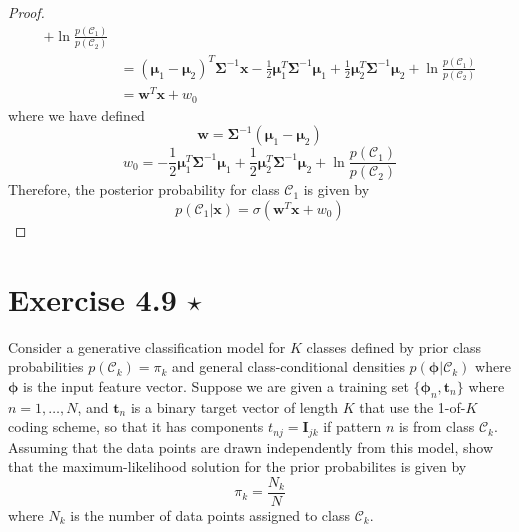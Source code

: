 \begin{proof}
\begin{align*}
        + \ln \frac{p(\mathcal{C}_1)}{p(\mathcal{C}_2)}\\
        &= (\bm{\mu}_1 - \bm{\mu}_2)^T \mathbf{\Sigma}^{-1} \mathbf{x}
        - \frac{1}{2} \bm{\mu}_1^T\mathbf{\Sigma}^{-1}\bm{\mu}_1
        + \frac{1}{2} \bm{\mu}_2^T\mathbf{\Sigma}^{-1}\bm{\mu}_2
        + \ln \frac{p(\mathcal{C}_1)}{p(\mathcal{C}_2)}\\
        &= \mathbf{w}^T\mathbf{x} + w_0
    \end{align*}
    where we have defined 
    \begin{equation*}
        \mathbf{w} = \mathbf{\Sigma}^{-1}(\bm{\mu}_1 - \bm{\mu}_2)
        \tag{4.66}\label{eq:4.66}
    \end{equation*}
    \vspace{-1em}
    \begin{equation*}
        w_0 = 
        - \frac{1}{2} \bm{\mu}_1^T\mathbf{\Sigma}^{-1}\bm{\mu}_1
        + \frac{1}{2} \bm{\mu}_2^T\mathbf{\Sigma}^{-1}\bm{\mu}_2
        + \ln \frac{p(\mathcal{C}_1)}{p(\mathcal{C}_2)}
        \tag{4.67}\label{eq:4.67}
    \end{equation*}
    Therefore, the posterior probability for class $\mathcal{C}_1$ 
    is given by
    \begin{equation*}
        p(\mathcal{C}_1 | \mathbf{x}) = \sigma(\mathbf{w}^T\mathbf{x} + w_0)
        \tag{4.65}\label{eq:4.65}
    \end{equation*}
\end{proof}

\section*{Exercise 4.9 $\star$}
Consider a generative classification model for $K$ classes
defined by prior class probabilities $p(\mathcal{C}_k) = \pi_k$
and general class-conditional densities  $p(\bm{\phi} | \mathcal{C}_k)$
where $\mathbf{\phi}$ is the input feature vector. Suppose
we are given a training set $\{\bm{\phi}_n, \mathbf{t}_n\}$ where
$n = 1,\ldots, N$, and $\mathbf{t}_n$ is a binary target vector
of length $K$ that use the 1-of-$K$ coding scheme, so
that it has components $t_{nj} = \mathbf{I}_{jk}$ if pattern
$n$ is from class $\mathcal{C}_k$. Assuming that the data points
are drawn independently from this model, show that the 
maximum-likelihood solution for the prior probabilites is given
by 
\begin{equation*}
    \pi_k = \frac{N_k}{N}
\end{equation*}
where $N_k$ is the number of data points assigned to class 
$\mathcal{C}_k$.

